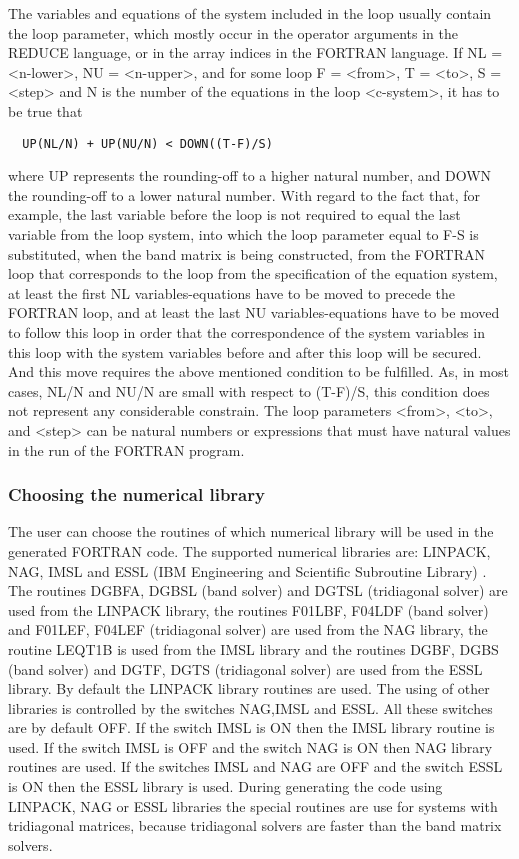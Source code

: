 The variables  and equations  of the system included in the loop usually
contain the loop parameter, which mostly occur in the operator arguments
in the REDUCE language, or in the array indices in the FORTRAN language.
     If NL  = <n-lower>, NU = <n-upper>, and for some loop F = <from>, T
= <to>, S = <step> and  N is  the number  of the  equations in  the loop
<c-system>, it has to be true that
\begin{verbatim}
  UP(NL/N) + UP(NU/N) < DOWN((T-F)/S)
\end{verbatim}
where UP  represents the  rounding-off to  a higher  natural number, and
DOWN the rounding-off to a lower natural number. With regard to the fact
that, for  example, the last variable before the loop is not required to
equal the last variable  from  the  loop  system,  into  which  the loop
parameter equal  to F-S  is substituted,  when the  band matrix is being
constructed, from the FORTRAN loop that corresponds to the loop from the
specification   of   the   equation   system,  at  least  the  first  NL
variables-equations have to be moved to precede the FORTRAN loop, and at
least the  last NU  variables-equations have  to be moved to follow this
loop in order that the correspondence  of the  system variables  in this
loop  with  the  system  variables  before  and  after this loop will be
secured. And this move requires  the  above  mentioned  condition  to be
fulfilled.   As, in  most cases, NL/N and NU/N are small with respect to
(T-F)/S, this condition does not represent any considerable constrain.
     The loop parameters <from>, <to>, and <step> can be natural numbers
or expressions that must have natural  values in the run of the  FORTRAN
program.


\subsubsection{Choosing the numerical library}

     The user can choose the routines of which numerical library will be
used in the generated FORTRAN  code.  The supported numerical  libraries
are:   LINPACK,  NAG,  IMSL  and  ESSL  (IBM  Engineering and Scientific
Subroutine Library) . The routines DGBFA, DGBSL (band solver) and  DGTSL
(tridiagonal solver)  are used  from the  LINPACK library,  the routines
F01LBF, F04LDF (band solver) and F01LEF, F04LEF (tridiagonal solver) are
used from  the NAG  library, the  routine LEQT1B  is used  from the IMSL
library  and  the  routines  DGBF,  DGBS  (band  solver)  and DGTF, DGTS
(tridiagonal solver)  are used  from the  ESSL library.   By default the
 LINPACK library  routines are  used. The  using of  other libraries  is
controlled by the switches NAG,IMSL and ESSL. All these switches are  by
default OFF. If the switch IMSL  is ON then the IMSL library  routine is
used. If  the switch  IMSL is  OFF and  the switch  NAG is  ON then  NAG
library routines are used. If the switches IMSL and NAG are OFF and  the
switch ESSL is ON then the  ESSL library is used. During generating  the
code using LINPACK, NAG or  ESSL libraries the special routines  are use
for systems with tridiagonal  matrices, because tridiagonal solvers  are
faster than the band matrix solvers.



